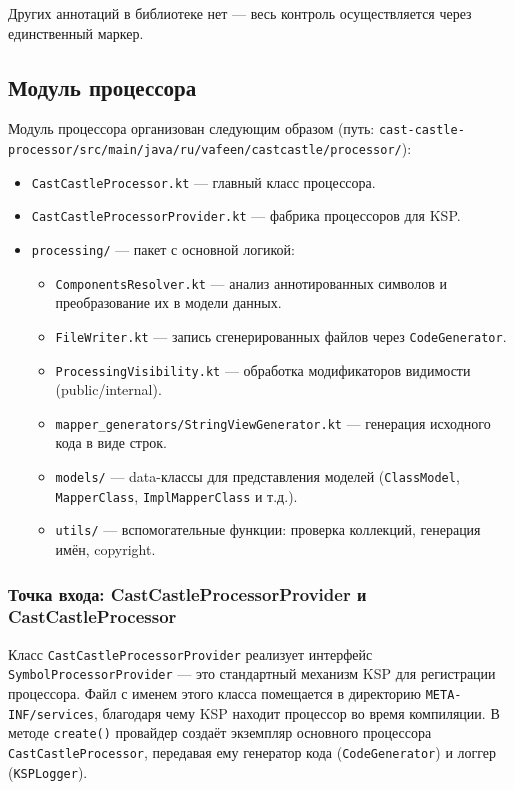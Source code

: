 Других аннотаций в библиотеке нет — весь контроль осуществляется через единственный маркер.

\subsection{Модуль процессора}

Модуль процессора организован следующим образом (путь: \texttt{cast-castle-processor/src/main/java/ru/vafeen/castcastle/processor/}):

\begin{itemize}
    \item \texttt{CastCastleProcessor.kt} — главный класс процессора.
    \item \texttt{CastCastleProcessorProvider.kt} — фабрика процессоров для KSP.
    \item \texttt{processing/} — пакет с основной логикой:
        \begin{itemize}
            \item \texttt{ComponentsResolver.kt} — анализ аннотированных символов и преобразование их в модели данных.
            \item \texttt{FileWriter.kt} — запись сгенерированных файлов через \texttt{CodeGenerator}.
            \item \texttt{ProcessingVisibility.kt} — обработка модификаторов видимости (public/internal).
            \item \texttt{mapper\_generators/StringViewGenerator.kt} — генерация исходного кода в виде строк.
            \item \texttt{models/} — data-классы для представления моделей (\texttt{ClassModel}, \texttt{MapperClass}, \texttt{ImplMapperClass} и т.д.).
            \item \texttt{utils/} — вспомогательные функции: проверка коллекций, генерация имён, copyright.
        \end{itemize}
\end{itemize}

\subsubsection{Точка входа: CastCastleProcessorProvider и CastCastleProcessor}

Класс \texttt{CastCastleProcessorProvider} реализует интерфейс \texttt{SymbolProcessorProvider} — это стандартный механизм KSP для регистрации процессора. Файл с именем этого класса помещается в директорию \texttt{META-INF/services}, благодаря чему KSP находит процессор во время компиляции. В методе \texttt{create()} провайдер создаёт экземпляр основного процессора \texttt{CastCastleProcessor}, передавая ему генератор кода (\texttt{CodeGenerator}) и логгер (\texttt{KSPLogger}).

